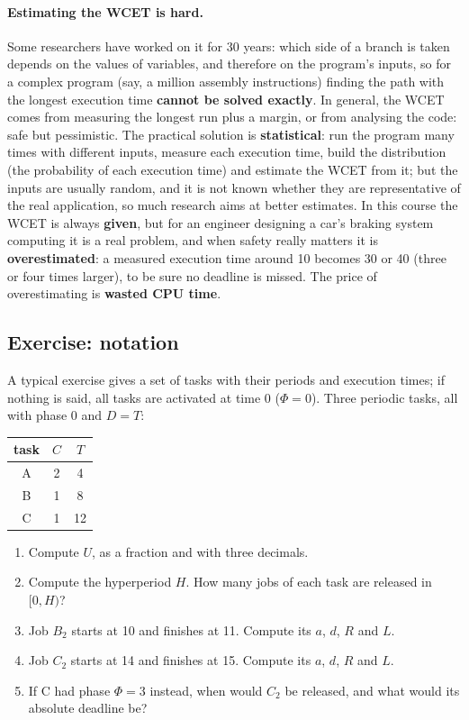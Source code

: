 \paragraph{Estimating the WCET is hard.} Some researchers have worked on it for 30 years: which side of a branch is taken depends on the values of variables, and therefore on the program's inputs, so for a complex program (say, a million assembly instructions) finding the path with the longest execution time \textbf{cannot be solved exactly}. In general, the WCET comes from measuring the longest run plus a margin, or from analysing the code: safe but pessimistic. The practical solution is \textbf{statistical}: run the program many times with different inputs, measure each execution time, build the distribution (the probability of each execution time) and estimate the WCET from it; but the inputs are usually random, and it is not known whether they are representative of the real application, so much research aims at better estimates. In this course the WCET is always \textbf{given}, but for an engineer designing a car's braking system computing it is a real problem, and when safety really matters it is \textbf{overestimated}: a measured execution time around 10 becomes 30 or 40 (three or four times larger), to be sure no deadline is missed. The price of overestimating is \textbf{wasted CPU time}.

\subsection{Exercise: notation}
A typical exercise gives a set of tasks with their periods and execution times; if nothing is said, all tasks are activated at time 0 ($\Phi = 0$). Three periodic tasks, all with phase 0 and $D = T$:
\begin{center}
\begin{tabular}{c c c}
\hline
task & $C$ & $T$ \\
\hline
A & 2 & 4 \\
B & 1 & 8 \\
C & 1 & 12 \\
\hline
\end{tabular}
\end{center}
\begin{enumerate}
    \item Compute $U$, as a fraction and with three decimals.
    \item Compute the hyperperiod $H$. How many jobs of each task are released in $[0, H)$?
    \item Job $B_2$ starts at 10 and finishes at 11. Compute its $a$, $d$, $R$ and $L$.
    \item Job $C_2$ starts at 14 and finishes at 15. Compute its $a$, $d$, $R$ and $L$.
    \item If C had phase $\Phi = 3$ instead, when would $C_2$ be released, and what would its absolute deadline be?
\end{enumerate}

